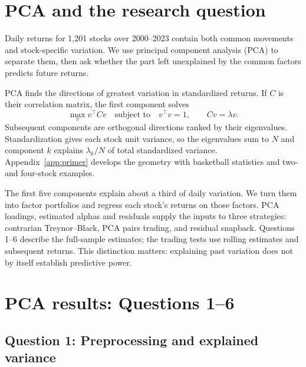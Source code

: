 \documentclass[11pt,letterpaper]{article}
\begin{document}

\section{PCA and the research question}
Daily returns for 1,201 stocks over 2000--2023 contain both common movements and
stock-specific variation. We use principal component analysis (PCA) to separate them, then
ask whether the part left unexplained by the common factors predicts future returns.

PCA finds the directions of greatest variation in standardized returns. If $C$ is their
correlation matrix, the first component solves
\[
    \max_v v^\top C v \quad\text{subject to}\quad v^\top v=1,
    \qquad Cv=\lambda v.
\]
Subsequent components are orthogonal directions ranked by their eigenvalues. Standardization
gives each stock unit variance, so the eigenvalues sum to $N$ and component $k$ explains
$\lambda_k/N$ of total standardized variance. Appendix~\ref{app:primer} develops the
geometry with basketball statistics and two- and four-stock examples.

The first five components explain about a third of daily variation. We turn them into factor
portfolios and regress each stock's returns on those factors. PCA loadings, estimated alphas
and residuals supply the inputs to three strategies: contrarian Treynor--Black, PCA pairs
trading, and residual snapback. Questions 1--6 describe the full-sample estimates; the
trading tests use rolling estimates and subsequent returns. This distinction matters:
explaining past variation does not by itself establish predictive power.


\section{PCA results: Questions 1--6}


\subsection*{Question 1: Preprocessing and explained variance}
\end{document}
